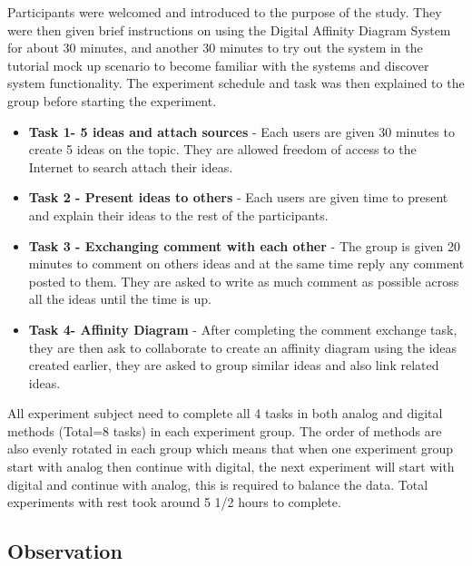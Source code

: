 \documentclass{sigchi}
\begin{document}
\begin{itemize}
\begin{itemize}
Participants were welcomed and introduced to the purpose of the study. They were then given brief instructions on using the Digital Affinity Diagram System for about 30 minutes, and another 30 minutes to try out the system in the tutorial mock up scenario to become familiar with the systems and discover system functionality. The experiment schedule and task was then explained to the group before starting the experiment. 

\begin{itemize}
\item \textbf{Task 1- 5 ideas and attach sources} - Each users are given 30 minutes to create 5 ideas on the topic. They are allowed freedom of access to the Internet to search attach their ideas. 
\item \textbf{Task 2 - Present  ideas to others } - Each users are given time to present and explain their ideas to the rest of the participants. 
\item \textbf{Task 3 - Exchanging comment with each other} - The group is given 20 minutes to comment on others ideas and at the same time reply any comment posted to them. They are asked to write as much comment as possible across all the ideas until the time is up. 

\item \textbf{Task 4- Affinity Diagram} - After completing the comment exchange task, they are then ask to collaborate to create an affinity diagram using the ideas created earlier, they are asked to group similar ideas and also link related ideas. 
\end{itemize}
All experiment subject need to complete all 4 tasks in both analog and digital methods (Total=8 tasks) in each experiment group. The order of methods are also evenly rotated in each group which means that when one experiment group start with analog then continue with digital, the next experiment will start with digital and continue with analog, this is required to balance the data. Total experiments with rest took around 5 1/2 hours to complete. 

\subsection{Observation}



\end{itemize}
\end{itemize}
\end{document}

